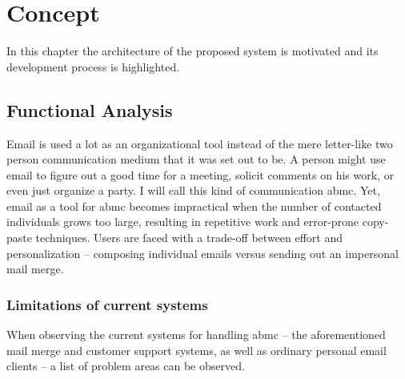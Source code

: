 \chapter{Concept}
\label{chapter:Concept}

In this chapter the architecture of the proposed system is motivated and its development process is highlighted.

\section{Functional Analysis}
\label{section:FunctionalAnalysis}

Email is used a lot as an organizational tool instead of the mere letter-like two person communication medium that it was set out to be. A person might use email to figure out a good time for a meeting, solicit comments on his work, or even just organize a party. I will call this kind of communication \acrlong{abmc}. Yet, email as a tool for \gls{abmc} becomes impractical when the number of contacted individuals grows too large, resulting in repetitive work and error-prone copy-paste techniques. Users are faced with a trade-off between effort and personalization -- composing individual emails versus sending out an impersonal mail merge.

\subsection{Limitations of current systems}

When observing the current systems for handling \gls{abmc} -- the aforementioned mail merge and customer support systems, as well as ordinary personal email clients -- a list of problem areas can be observed.

